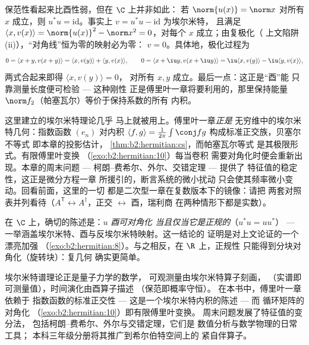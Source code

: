 \begin{example}[等距变换恰好就是酉变换]\label{ex:b2:hermitian:isometry}
保范性看起来比酉性弱，但在 $\C$ 上并非如此：
若 $\norm{u(x)} = \norm x$ 对所有 $x$ 成立，则 $u^*u =
\mathrm{id}$。事实上 $v = u^*u - \mathrm{id}$ 为埃尔米特，
且满足 $\langle x, v(x)\rangle = \norm{u(x)}^2 - \norm x^2 =
0$，对每个 $x$ 成立；由复极化（
上文陷阱 (ii)），“对角线”恒为零的映射必为零：
$v = 0$。具体地，极化过程为
\[
0 = \langle x + y, v(x+y)\rangle
= \langle x, v(y)\rangle + \langle y, v(x)\rangle,
\qquad
0 = \langle x + \iu y, v(x + \iu y)\rangle
= \iu\langle x, v(y)\rangle - \iu\langle y, v(x)\rangle ,
\]
两式合起来即得 $\langle x, v(y)\rangle = 0$，
对所有 $x, y$ 成立。最后一点：这正是“酉”能
只靠测量长度便可检验 --- 这种刚性
正是傅里叶一章将要利用的，那里保持能量
$\norm f_2$（帕塞瓦尔）等价于保持系数的所有
内积。
\end{example}

\begin{remark}[本卷中的几种视角]
这里建立的埃尔米特理论几乎
马上就被用上。傅里叶一章\emph{正是}
无穷维中的埃尔米特几何：指数函数 $(e_n)$
对内积 $\langle f, g\rangle =
\frac{1}{2\pi}\int\conj fg$ 构成标准正交族，贝塞尔不等式
即本章的投影估计，
\cref{thm:b2:hermitian:cs}，而帕塞瓦尔等式
是其极限形式。有限傅里叶变换
（\cref{exo:b2:hermitian:10}）每当卷积
需要对角化时便会重新出现。本章的周末问题 ---
柯朗–费希尔、外尔、交错定理 --- 提供了
特征值的稳定性，这正是微分方程一章
所援引的，断言系统的微小扰动
只会使其频率微小变动。回看前面，这里的一切
都是二次型一章在复数版本下的镜像：请把
两套对照表并列看待（$A^{\mathsf T} \leftrightarrow
A^\dagger$，正交 $\leftrightarrow$ 酉，瑞利商
在两种情形下都是实数）。
\end{remark}

\begin{remark}[正规自同态]
在 $\C$ 上，确切的陈述是：$u$ \emph{酉可对角化
当且仅当它是正规的}（$u^*u = uu^*$） ---
一举涵盖埃尔米特、酉与反埃尔米特映射。这一结论的
证明是对上文论证的一个漂亮加强
（\cref{exo:b2:hermitian:8}）。与之相反，在 $\R$ 上，正规性
只能得到分块对角化（旋转块）：复几何
确实更简单。
\end{remark}

\begin{remark}[应用背景]
埃尔米特谱理论正是量子力学的数学，
可观测量由埃尔米特算子刻画，
（实谱即可测量值），时间演化由酉算子描述
（保范即概率守恒）。
在本书中，傅里叶一章依赖于
指数函数的标准正交性 --- 这是一个埃尔米特内积的陈述 --- 而
循环矩阵的对角化
（\cref{exo:b2:hermitian:10}）即有限傅里叶变换。
周末问题发展了特征值的变分法，
包括柯朗–费希尔、外尔与交错定理，它们是
数值分析与数学物理的日常工具；
本科三年级分册将其推广到希尔伯特空间上的
紧自伴算子。
\end{remark}

